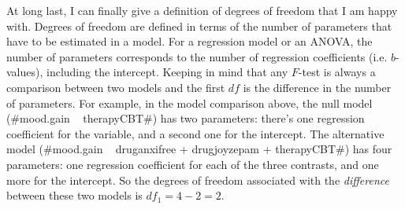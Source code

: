 \begin{comment} %
Ah, that's better. Our $F$-statistic is 26.15, the degrees of freedom are 2 and 14, and the $p$-value is $0.00002$. The numbers are identical to the ones we obtained for the main effect of \rtext{drug} in our original ANOVA. Once again we see that ANOVA and regression are essentially the same. They are both linear models, and the underlying statistical machinery for ANOVA is identical to the machinery used in regression. The importance of this fact should not be understated. Throughout the rest of this chapter we're going to rely heavily on this idea. 

Although we went through all the faff of computing new variables in jamovi for the contrasts \rtext{druganxifree} and \rtext{drugjoyzepam}, just to show that ANOVA and regression are essentially the same, in the jamovi linear regression analysis there is actually a nifty shortcut to get these contrasts, see Figure~\ref{fig:regfactors}. What jamovi is doing here is allowing you to enter the predictor variables that are factors as, wait for it...factors! Smart, eh. You can also specify which group to use as the reference level, via the `Reference Levels' option. We've changed this to `placebo' and `no.therapy', respectively, because this makes most sense. 

\end{comment}


At long last, I can finally give a definition of degrees of freedom that I am happy with. Degrees of freedom are defined in terms of the number of parameters that have to be estimated in a model. For a regression model or an ANOVA, the number of parameters corresponds to the number of regression coefficients (i.e. $b$-values), including the intercept. Keeping in mind that any $F$-test is always a comparison between two models and the first $df$ is the difference in the number of parameters. For example, in the model comparison above, the null model (\rtextverb#mood.gain ~ therapyCBT#) has two parameters: there's one regression coefficient for the  variable, and a second one for the intercept. The  alternative model (\rtextverb#mood.gain ~ druganxifree + drugjoyzepam + therapyCBT#) has four parameters: one regression coefficient for each of the three contrasts, and one more for the intercept. So the degrees of freedom associated with the {\it difference} between these two models is $df_1 = 4-2 = 2$. 


